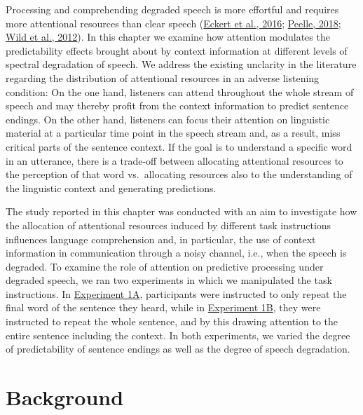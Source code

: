 \documentclass[a4paper, nobind]{templates/ociamthesis}
\begin{document}
Processing and comprehending degraded speech is more effortful and requires more attentional resources than clear speech (\protect\hyperlink{ref-Eckert2016}{Eckert et al., 2016}; \protect\hyperlink{ref-Peelle2018}{Peelle, 2018}; \protect\hyperlink{ref-Wild2012}{Wild et al., 2012}).
In this chapter we examine how attention modulates the predictability effects brought about by context information at different levels of spectral degradation of speech.
We address the existing unclarity in the literature regarding the distribution of attentional resources in an adverse listening condition:
On the one hand, listeners can attend throughout the whole stream of speech and may thereby profit from the context information to predict sentence endings.
On the other hand, listeners can focus their attention on linguistic material at a particular time point in the speech stream and, as a result, miss critical parts of the sentence context.
If the goal is to understand a specific word in an utterance, there is a trade-off between allocating attentional resources to the perception of that word vs.~allocating resources also to the understanding of the linguistic context and generating predictions.

The study reported in this chapter was conducted with an aim to investigate how the allocation of attentional resources induced by different task instructions influences language comprehension and, in particular, the use of context information in communication through a noisy channel, i.e., when the speech is degraded.
To examine the role of attention on predictive processing under degraded speech, we ran two experiments in which we manipulated the task instructions.
In \protect\hyperlink{experiment1a}{Experiment 1A}, participants were instructed to only repeat the final word of the sentence they heard,
while in \protect\hyperlink{experiment1b}{Experiment 1B}, they were instructed to repeat the whole sentence, and by this drawing attention to the entire sentence including the context.
In both experiments, we varied the degree of predictability of sentence endings as well as the degree of speech degradation.

\hypertarget{background}{%
\section{Background}\label{background}}
\end{document}
